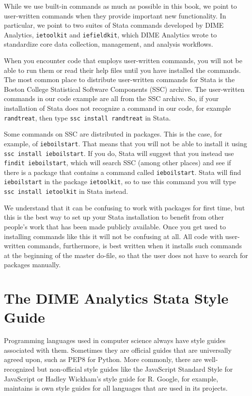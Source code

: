 While we use built-in commands as much as possible in this book,
we point to user-written commands when they provide important new functionality.
In particular, we point to two suites of Stata commands developed by DIME Analytics,
\texttt{ietoolkit} and
\texttt{iefieldkit},
which DIME Analytics wrote to standardize
core data collection, management, and analysis workflows.

When you encounter code that employs user-written commands,
you will not be able to run them or read their help files
until you have installed the commands.
The most common place to distribute user-written commands for Stata
is the Boston College Statistical Software Components (SSC) archive.
The user-written commands in our code example are all from the SSC archive.
So, if your installation of Stata does not recognize a command in our code, for example
\texttt{randtreat}, then type \texttt{ssc install randtreat} in Stata.

Some commands on SSC are distributed in packages.
This is the case, for example, of \texttt{ieboilstart}.
That means that you will not be able to install it using \texttt{ssc install ieboilstart}.
If you do, Stata will suggest that you instead use \texttt{findit ieboilstart},
which will search SSC (among other places) and see if there is a
package that contains a command called \texttt{ieboilstart}.
Stata will find \texttt{ieboilstart} in the package \texttt{ietoolkit},
so to use this command you will type \texttt{ssc install ietoolkit} in Stata instead.

We understand that it can be confusing to work with packages for first time,
but this is the best way to set up your Stata installation to benefit from other
people's work that has been made publicly available.
Once you get used to installing commands like this it will not be confusing at all.
All code with user-written commands, furthermore, is best written when it installs such commands
at the beginning of the master do-file,
so that the user does not have to search for packages manually.

\section{The DIME Analytics Stata Style Guide}

Programming languages used in computer science
always have style guides associated with them.
Sometimes they are official guides that are universally agreed upon,
such as PEP8 for Python.
More commonly, there are well-recognized but
non-official style guides like the JavaScript Standard Style
for JavaScript or Hadley Wickham's style guide for R.
Google, for example, maintains is own style guides for all languages
that are used in its projects.

